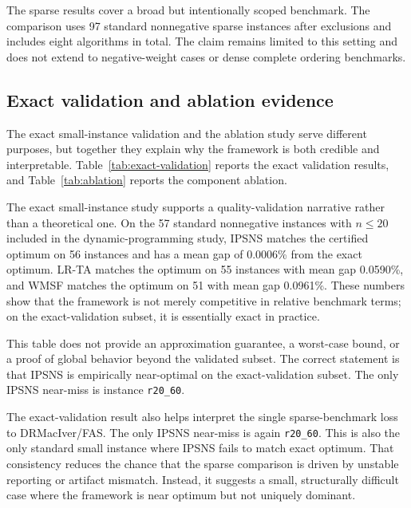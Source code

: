 

The sparse results cover a broad but intentionally scoped benchmark. The comparison uses 97 standard nonnegative sparse instances after exclusions and includes eight algorithms in total. The claim remains limited to this setting and does not extend to negative-weight cases or dense complete ordering benchmarks.

\subsection{Exact validation and ablation evidence}

The exact small-instance validation and the ablation study serve different purposes, but together they explain why the framework is both credible and interpretable. Table~\ref{tab:exact-validation} reports the exact validation results, and Table~\ref{tab:ablation} reports the component ablation.





The exact small-instance study supports a quality-validation narrative rather than a theoretical one. On the 57 standard nonnegative instances with \(n \le 20\) included in the dynamic-programming study, IPSNS matches the certified optimum on 56 instances and has a mean gap of 0.0006\% from the exact optimum. LR-TA matches the optimum on 55 instances with mean gap 0.0590\%, and WMSF matches the optimum on 51 with mean gap 0.0961\%. These numbers show that the framework is not merely competitive in relative benchmark terms; on the exact-validation subset, it is essentially exact in practice.

This table does not provide an approximation guarantee, a worst-case bound, or a proof of global behavior beyond the validated subset. The correct statement is that IPSNS is empirically near-optimal on the exact-validation subset. The only IPSNS near-miss is instance \texttt{r20\_60}.

The exact-validation result also helps interpret the single sparse-benchmark loss to DRMacIver/FAS. The only IPSNS near-miss is again \texttt{r20\_60}. This is also the only standard small instance where IPSNS fails to match exact optimum. That consistency reduces the chance that the sparse comparison is driven by unstable reporting or artifact mismatch. Instead, it suggests a small, structurally difficult case where the framework is near optimum but not uniquely dominant.

